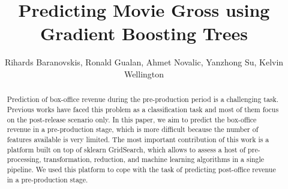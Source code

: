 \documentclass[sigconf]{acmart}
\begin{document}
\title{Predicting Movie Gross using Gradient Boosting Trees}
\author{Rihards Baranovskis, Ronald  Gualan, Ahmet Novalic, Yanzhong Su, Kelvin Wellington }


\begin{abstract}
Prediction of box-office revenue during the pre-production period is a challenging task. Previous works have faced this problem as a classification task and most of them focus on the post-release scenario only. In this paper, we aim to predict the box-office revenue in a pre-production stage, which is more difficult because the number of features available is very limited. The most important contribution of this work is a platform built on top of sklearn GridSearch, which allows to assess a host of pre-processing, transformation, reduction, and machine learning algorithms in a single pipeline. We used this platform to cope with the task of predicting post-office revenue in a pre-production stage. 
\end{abstract}


\maketitle




 
\end{document}
